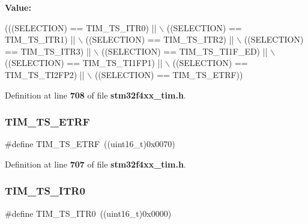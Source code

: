 {\bfseries Value\+:}
\begin{DoxyCode}
(((SELECTION) == TIM_TS_ITR0) || \(\backslash\)
                                             ((SELECTION) == TIM_TS_ITR1) || \(\backslash\)
                                             ((SELECTION) == TIM_TS_ITR2) || \(\backslash\)
                                             ((SELECTION) == TIM_TS_ITR3) || \(\backslash\)
                                             ((SELECTION) == TIM_TS_TI1F_ED) || \(\backslash\)
                                             ((SELECTION) == TIM_TS_TI1FP1) || \(\backslash\)
                                             ((SELECTION) == TIM_TS_TI2FP2) || \(\backslash\)
                                             ((SELECTION) == TIM_TS_ETRF))
\end{DoxyCode}


Definition at line \textbf{ 708} of file \textbf{ stm32f4xx\+\_\+tim.\+h}.

\mbox{\label{group__TIM__Internal__Trigger__Selection_gaece08e02e056613a882aa7ff0a6ccc2d}} 
\subsubsection{T\+I\+M\+\_\+\+T\+S\+\_\+\+E\+T\+RF}
{\footnotesize\ttfamily \#define T\+I\+M\+\_\+\+T\+S\+\_\+\+E\+T\+RF~((uint16\+\_\+t)0x0070)}



Definition at line \textbf{ 707} of file \textbf{ stm32f4xx\+\_\+tim.\+h}.

\mbox{\label{group__TIM__Internal__Trigger__Selection_gab7cf2b7db3956d4fd1e5a5d84f4891e7}} 
\subsubsection{T\+I\+M\+\_\+\+T\+S\+\_\+\+I\+T\+R0}
{\footnotesize\ttfamily \#define T\+I\+M\+\_\+\+T\+S\+\_\+\+I\+T\+R0~((uint16\+\_\+t)0x0000)}



